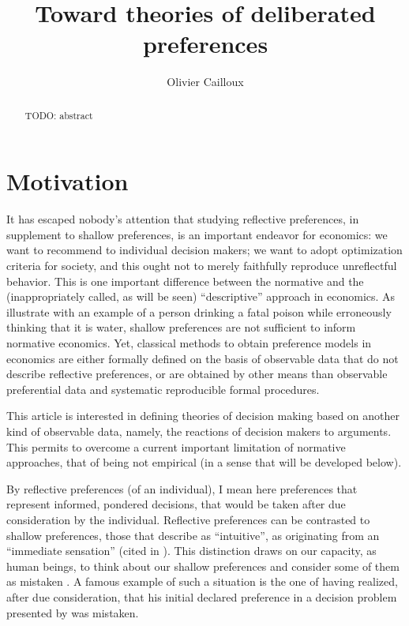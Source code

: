 \documentclass[version=last, pagesize, twoside=off, bibliography=totoc, DIV=calc, fontsize=12pt, a4paper, french, english]{scrartcl}
\begin{document}
\title{Toward theories of deliberated preferences}
\author{Olivier Cailloux}
\makeatletter
\makeatother
\maketitle

\begin{abstract}
	TODO: abstract
\end{abstract}

\section{Motivation} 
It has escaped nobody’s attention that 
studying reflective preferences, in supplement to shallow preferences, is an important endeavor for economics: we want to recommend to individual decision makers; we want to adopt optimization criteria for society, and this ought not to merely faithfully reproduce unreflectful behavior. This is one important difference between the normative and the (inappropriately called, as will be seen) “descriptive” approach in economics. As \citet{hausman_preference_1994} illustrate with an example of a person drinking a fatal poison while erroneously thinking that it is water, shallow preferences are not sufficient to inform normative economics.
Yet, classical methods to obtain preference models in economics are either formally defined on the basis of observable data that do not describe reflective preferences, or are obtained by other means than observable preferential data and systematic reproducible formal procedures. 

This article is interested in defining theories of decision making based on another kind of observable data, namely, the reactions of decision makers to arguments. This permits to overcome a current important limitation of normative approaches, that of being not empirical (in a sense that will be developed below).

By reflective preferences (of an individual), I mean here preferences that represent informed, pondered decisions, that would be taken after due consideration by the individual. Reflective preferences can be contrasted to shallow preferences, those that \citet[p.\ 16]{von_neumann_theory_2004} describe as “intuitive”, as originating from an “immediate sensation” (cited in \citet{fishburn_retrospective_1989}).
This distinction draws on our capacity, as human beings, to think about our shallow preferences and consider some of them as mistaken \citep{frankfurt_freedom_1971}. A famous example of such a situation is the one of \citet[pp.\ 101--103]{savage_foundations_1972} having realized, after due consideration, that his initial declared preference in a decision problem presented by \citet{allais_so-called_1979} was mistaken.
\end{document}
